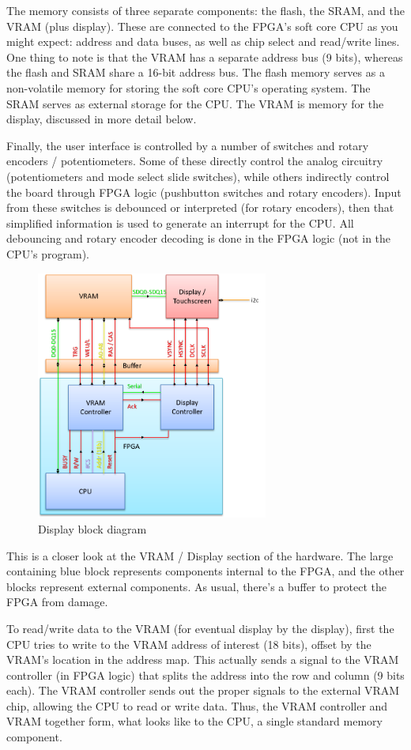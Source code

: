 The memory consists of three separate components: the flash, the SRAM, and the VRAM (plus display). These are connected to the FPGA's soft core CPU as you might expect: address and data buses, as well as chip select and read/write lines. One thing to note is that the VRAM has a separate address bus (9 bits), whereas the flash and SRAM share a 16-bit address bus. The flash memory serves as a non-volatile memory for storing the soft core CPU's operating system. The SRAM serves as external storage for the CPU. The VRAM is memory for the display, discussed in more detail below.

Finally, the user interface is controlled by a number of switches and rotary encoders / potentiometers. Some of these directly control the analog circuitry (potentiometers and mode select slide switches), while others indirectly control the board through FPGA logic (pushbutton switches and rotary encoders). Input from these switches is debounced or interpreted (for rotary encoders), then that simplified information is used to generate an interrupt for the CPU. All debouncing and rotary encoder decoding is done in the FPGA logic (not in the CPU's program).

\begin{figure}[ht!]
    \centering
    \includegraphics[width=3in]{block_diagrams/video.png}
		\caption{Display block diagram}
\end{figure}

This is a closer look at the VRAM / Display section of the hardware. The large containing blue block represents components internal to the FPGA, and the other blocks represent external components. As usual, there's a buffer to protect the FPGA from damage.

To read/write data to the VRAM (for eventual display by the display), first the CPU tries to write to the VRAM address of interest (18 bits), offset by the VRAM's location in the address map. This actually sends a signal to the VRAM controller (in FPGA logic) that splits the address into the row and column (9 bits each). The VRAM controller sends out the proper signals to the external VRAM chip, allowing the CPU to read or write data. Thus, the VRAM controller and VRAM together form, what looks like to the CPU, a single standard memory component.

